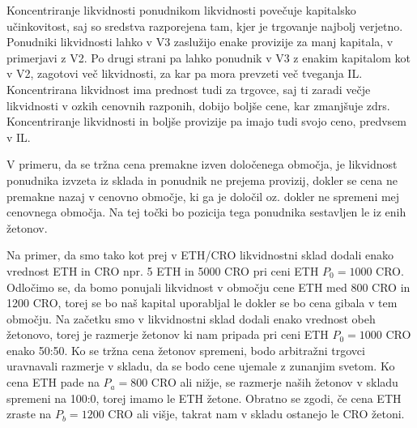 \documentclass[a4paper,12pt]{article}%
\begin{document}
Koncentriranje likvidnosti ponudnikom likvidnosti povečuje kapitalsko učinkovitost, saj so sredstva razporejena tam, kjer je trgovanje najbolj verjetno. Ponudniki likvidnosti lahko v V3 zaslužijo enake provizije za manj kapitala, v primerjavi z V2. 
Po drugi strani pa lahko ponudnik v V3 z enakim kapitalom kot v V2, zagotovi več likvidnosti, za kar pa mora prevzeti več tveganja IL. 
Koncentrirana likvidnost ima prednost tudi za trgovce, saj ti zaradi večje likvidnosti v ozkih cenovnih razponih, dobijo boljše cene, kar zmanjšuje zdrs.  
Koncentriranje likvidnosti in boljše provizije pa imajo tudi svojo ceno, predvsem v IL.

V primeru, da se tržna cena premakne izven določenega območja, je likvidnost ponudnika izvzeta iz sklada in ponudnik ne prejema provizij, dokler se cena ne premakne nazaj v cenovno območje, ki ga je določil oz. dokler ne spremeni mej cenovnega območja. Na tej točki bo pozicija tega ponudnika sestavljen le iz enih žetonov. 

Na primer, da smo tako kot prej v ETH/CRO likvidnostni sklad  dodali enako vrednost ETH in CRO npr. 5 ETH in 5000 CRO pri ceni ETH  $P_0 = 1000$ CRO. Odločimo se, da bomo ponujali likvidnost v območju cene ETH med 800 CRO in 1200 CRO, torej se bo naš kapital uporabljal le dokler se bo cena gibala v tem območju. Na začetku smo v likvidnostni sklad dodali enako vrednost obeh žetonovo, torej je razmerje žetonov ki nam pripada pri ceni ETH $P_0 = 1000$ CRO enako 50:50. Ko se tržna cena žetonov spremeni, bodo arbitražni trgovci uravnavali  razmerje v skladu, da se bodo cene ujemale z zunanjim svetom. Ko cena ETH pade na $P_a = 800$ CRO ali nižje, se razmerje naših žetonov v skladu spremeni na 100:0, torej imamo le ETH žetone. Obratno se zgodi, če cena ETH zraste na $P_b = 1200$ CRO ali višje, takrat nam v skladu ostanejo le CRO žetoni.
\end{document}
